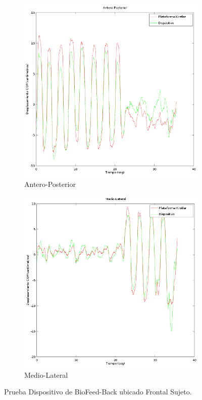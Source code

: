 \documentclass[12pt,a4paper]{article}
\newcommand{\nombreDispositivo}{Dispositivo de BioFeed-Back }
\begin{document}
	\begin{figure}[H]
		\centering
		\begin{subfigure}{.5\textwidth}
			\centering
			\includegraphics[width=1\linewidth]{images/pruebas/Frontal/Antero-Posterior}
			\caption{Antero-Posterior}
			\label{fig:anteroPosterioFrontal}
		\end{subfigure}%
		\begin{subfigure}{.5\textwidth}
			\centering
			\includegraphics[width=1\linewidth]{images/pruebas/Frontal/Medio-Lateral}
			\caption{Medio-Lateral}
			\label{fig:medioLateralFrontal}
		\end{subfigure}
		\caption{Prueba \nombreDispositivo ubicado Frontal Sujeto.}
		\label{fig:pruebaLateralFrontal}
	\end{figure}
	
\end{document}
